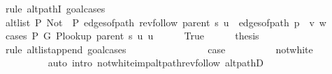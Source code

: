 \begin{isabellebody}
%
\isadelimproof
%
\endisadelimproof
%
\isatagproof
{}\isamarkupfalse%
\ {\isacharparenleft}{\kern0pt}rule\ alt{\isacharunderscore}{\kern0pt}pathI{\isacharcomma}{\kern0pt}\ goal{\isacharunderscore}{\kern0pt}cases{\isacharparenright}{\kern0pt}\isanewline
\ \ \isamarkupfalse%
\ {}\isanewline
\ \ \isamarkupfalse%
\ {\isachardoublequoteopen}alt{\isacharunderscore}{\kern0pt}list\ P{\isacharprime}{\kern0pt}{\isacharprime}{\kern0pt}\ {\isacharparenleft}{\kern0pt}Not\ {\isasymcirc}\ P{\isacharprime}{\kern0pt}{\isacharprime}{\kern0pt}{\isacharparenright}{\kern0pt}\ {\isacharparenleft}{\kern0pt}edges{\isacharunderscore}{\kern0pt}of{\isacharunderscore}{\kern0pt}path\ {\isacharparenleft}{\kern0pt}rev{\isacharunderscore}{\kern0pt}follow\ {\isacharparenleft}{\kern0pt}parent\ s{\isacharparenright}{\kern0pt}\ u{\isacharparenright}{\kern0pt}\ {\isacharat}{\kern0pt}\ edges{\isacharunderscore}{\kern0pt}of{\isacharunderscore}{\kern0pt}path\ {\isacharparenleft}{\kern0pt}p\ {\isacharat}{\kern0pt}\ {\isacharbrackleft}{\kern0pt}v{\isacharcomma}{\kern0pt}\ w{\isacharbrackright}{\kern0pt}{\isacharparenright}{\kern0pt}{\isacharparenright}{\kern0pt}{\isachardoublequoteclose}\isanewline
\ \ \isamarkupfalse%
\ {\isacharparenleft}{\kern0pt}cases\ {\isachardoublequoteopen}P{\isacharprime}{\kern0pt}\ G{}\ {\isacharparenleft}{\kern0pt}P{\isacharunderscore}{\kern0pt}lookup\ {\isacharparenleft}{\kern0pt}parent\ s{\isacharparenright}{\kern0pt}\ u{\isacharparenright}{\kern0pt}\ u{\isachardoublequoteclose}{\isacharparenright}{\kern0pt}\isanewline
\ \ \ \ \isamarkupfalse%
\ True\isanewline
\ \ \ \ \isamarkupfalse%
\ {\isacharquery}{\kern0pt}thesis\isanewline
\ \ \ \ \isamarkupfalse%
\ {\isacharparenleft}{\kern0pt}rule\ alt{\isacharunderscore}{\kern0pt}list{\isacharunderscore}{\kern0pt}append{\isacharunderscore}{\kern0pt}{}{\isacharprime}{\kern0pt}{\isacharcomma}{\kern0pt}\ goal{\isacharunderscore}{\kern0pt}cases{\isacharparenright}{\kern0pt}\isanewline
\ \ \ \ \ \ \isamarkupfalse%
\ {}\isanewline
\ \ \ \ \ \ \isamarkupfalse%
\ {\isacharquery}{\kern0pt}case\isanewline
\ \ \ \ \ \ \ \ \isamarkupfalse%
\ not{\isacharunderscore}{\kern0pt}white\isanewline
\ \ \ \ \ \ \ \ \isamarkupfalse%
\ {\isacharparenleft}{\kern0pt}auto\ intro{\isacharcolon}{\kern0pt}\ not{\isacharunderscore}{\kern0pt}white{\isacharunderscore}{\kern0pt}imp{\isacharunderscore}{\kern0pt}alt{\isacharunderscore}{\kern0pt}path{\isacharunderscore}{\kern0pt}rev{\isacharunderscore}{\kern0pt}follow\ alt{\isacharunderscore}{\kern0pt}pathD{\isacharparenleft}{\kern0pt}{}{\isacharparenright}{\kern0pt}{\isacharparenright}{\kern0pt}\isanewline

\end{isabellebody}
